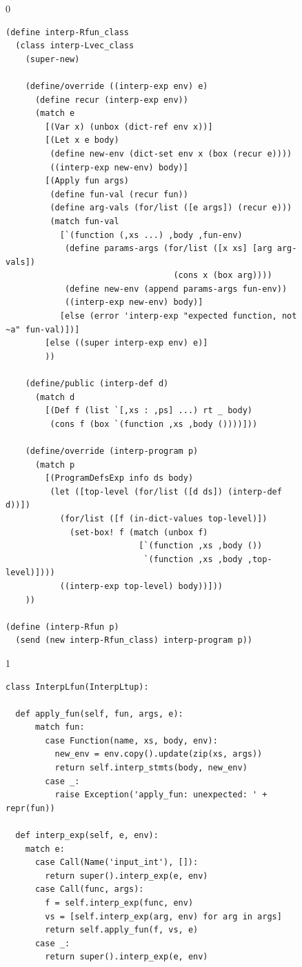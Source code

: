 \documentclass[7x10,nocrop]{TimesAPriori_MIT}%
\def\racketEd{0}
\def\pythonEd{1}
\def\edition{0}
\begin{document}
\begin{figure}[tp]
{\if\edition\racketEd  
\begin{lstlisting}
(define interp-Rfun_class
  (class interp-Lvec_class
    (super-new)

    (define/override ((interp-exp env) e)
      (define recur (interp-exp env))
      (match e
        [(Var x) (unbox (dict-ref env x))]
        [(Let x e body)
         (define new-env (dict-set env x (box (recur e))))
         ((interp-exp new-env) body)]
        [(Apply fun args)
         (define fun-val (recur fun))
         (define arg-vals (for/list ([e args]) (recur e)))
         (match fun-val
           [`(function (,xs ...) ,body ,fun-env)
            (define params-args (for/list ([x xs] [arg arg-vals])
                                  (cons x (box arg))))
            (define new-env (append params-args fun-env))
            ((interp-exp new-env) body)]
           [else (error 'interp-exp "expected function, not ~a" fun-val)])]
        [else ((super interp-exp env) e)]
        ))

    (define/public (interp-def d)
      (match d
        [(Def f (list `[,xs : ,ps] ...) rt _ body)
         (cons f (box `(function ,xs ,body ())))]))

    (define/override (interp-program p)
      (match p
        [(ProgramDefsExp info ds body)
         (let ([top-level (for/list ([d ds]) (interp-def d))])
           (for/list ([f (in-dict-values top-level)])
             (set-box! f (match (unbox f)
                           [`(function ,xs ,body ())
                            `(function ,xs ,body ,top-level)])))
           ((interp-exp top-level) body))]))
    ))

(define (interp-Rfun p)
  (send (new interp-Rfun_class) interp-program p))
\end{lstlisting}
\fi}
{\if\edition\pythonEd
\begin{lstlisting}
class InterpLfun(InterpLtup):
  
  def apply_fun(self, fun, args, e):
      match fun:
        case Function(name, xs, body, env):
          new_env = env.copy().update(zip(xs, args))
          return self.interp_stmts(body, new_env)
        case _:
          raise Exception('apply_fun: unexpected: ' + repr(fun))
    
  def interp_exp(self, e, env):
    match e:
      case Call(Name('input_int'), []):
        return super().interp_exp(e, env)      
      case Call(func, args):
        f = self.interp_exp(func, env)
        vs = [self.interp_exp(arg, env) for arg in args]
        return self.apply_fun(f, vs, e)
      case _:
        return super().interp_exp(e, env)


\end{lstlisting}}
\end{figure}
\end{document}
